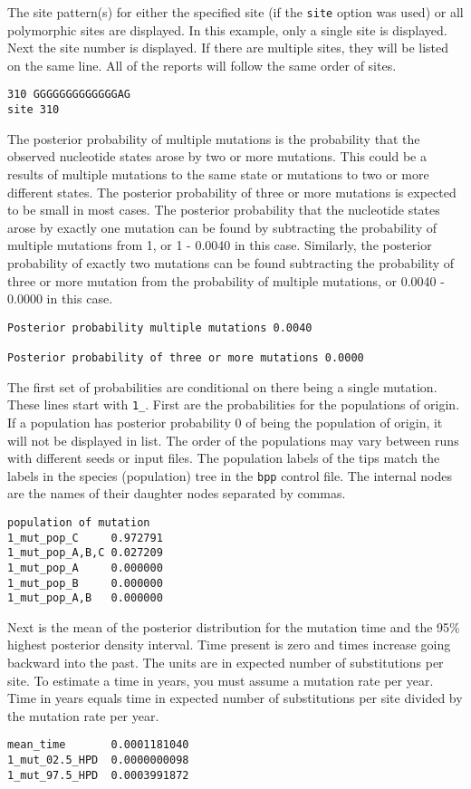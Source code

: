 \documentclass[11pt]{article}
\begin{document}
The site pattern(s) for either the specified site (if the \texttt{site} option was used) or all polymorphic sites are displayed. 
In this example, only a single site is displayed.
Next the site number is displayed. If there are multiple sites, they will be listed on the same line. 
All of the reports will follow the same order of sites.
\begin{Verbatim}[frame=single, fontsize=\small]
310 GGGGGGGGGGGGGAG
site 310	
\end{Verbatim}

The posterior probability of multiple mutations is the probability that the observed nucleotide states arose by two or more mutations. 
This could be a results of multiple mutations to the same state or mutations to two or more different states.
The posterior probability of three or more mutations is expected to be small in most cases. 
The posterior probability that the nucleotide states arose by exactly one mutation can be found by subtracting the probability of multiple mutations from 1, or 1 - 0.0040 in this case. 
Similarly, the posterior probability of exactly two mutations can be found subtracting the probability of three or more mutation from the probability of multiple mutations, or 0.0040 - 0.0000 in this case.
\begin{Verbatim}[frame=single, fontsize=\small]
Posterior probability multiple mutations 0.0040
		
Posterior probability of three or more mutations 0.0000
\end{Verbatim}

The first set of probabilities are conditional on there being a single mutation.
These lines start with \texttt{1\_}.
First are the probabilities for the populations of origin. 
If a population has posterior probability 0 of being the population of origin, it will not be displayed in list. 
The order of the populations may vary between runs with different seeds or input files. 
The population labels of the tips match the labels in the species (population) tree in the \texttt{bpp} control file. 
The internal nodes are the names of their daughter nodes separated by commas.
\begin{Verbatim}[frame=single, fontsize=\small]
population of mutation
1_mut_pop_C    	0.972791	
1_mut_pop_A,B,C	0.027209	
1_mut_pop_A    	0.000000	
1_mut_pop_B    	0.000000	
1_mut_pop_A,B  	0.000000
\end{Verbatim}

Next is the mean of the posterior distribution for the mutation time and the 95\% highest posterior density interval. 
Time present is zero and times increase going backward into the past. 
The units are in expected number of substitutions per site. 
To estimate a time in years, you must assume a mutation rate per year. 
Time in years equals time in expected number of substitutions per site divided by the mutation rate per year.
\begin{Verbatim}[frame=single, fontsize=\small]
mean_time     	0.0001181040	
1_mut_02.5_HPD	0.0000000098	
1_mut_97.5_HPD	0.0003991872
\end{Verbatim}
\end{document}
